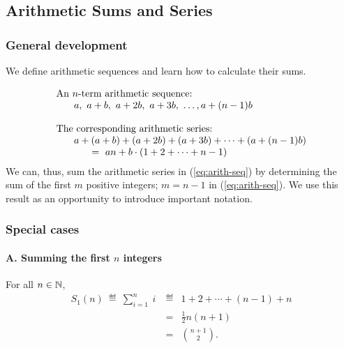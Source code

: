 \subsection{Arithmetic Sums and Series}
\label{sec:arithmetic-series}

\subsubsection{General development}

We define arithmetic sequences and learn how to calculate their sums.

\begin{equation}
\label{eq:arith-seq}
\begin{array}{l}
\mbox{An $n$-term arithmetic sequence:} \\
\hspace*{.25in}a, \ a+b, \ a+2b, \ a+3b, \ \ldots, a+(n-1)b \\
\\
\mbox{The corresponding arithmetic series:} \\
\hspace*{.25in}a + (a+b) + (a+2b) + (a+3b) + \cdots + (a+(n-1)b) \\
\hspace*{.5in} = \
an + b \cdot (1 + 2 + \cdots + n-1)
\end{array}
\end{equation}
We can, thus, sum the arithmetic series in (\ref{eq:arith-seq}) by
determining the sum of the first $m$ positive integers; $m = n-1$ in
(\ref{eq:arith-seq}).  We use this result as an opportunity to
introduce important notation.

\subsubsection{Special cases}


\paragraph{A. Summing the first $n$ integers}

\begin{prop}
\label{thm:sum-first-integers-Gauss}
For all $n \in \mathbb{N}$,
\begin{eqnarray}
\nonumber
S_1(n) \ \eqdef \ \sum_{i=1}^n \ i \
  & \eqdef &
 1 + 2 + \cdots + (n-1) + n \\
\label{eq:sum-1-to-n}
  & = & \frac{1}{2} n (n+1) \\
\nonumber
  & = & {{n+1}  \choose 2}.
\end{eqnarray}
\end{prop}

